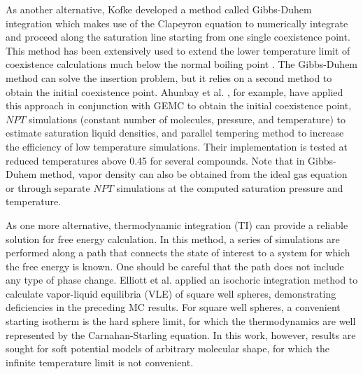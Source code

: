 \documentclass[5p,times]{elsarticle}
\begin{document}
As another alternative, Kofke \cite{Kofke1993b} developed a method called Gibbs-Duhem integration which makes use of the Clapeyron equation to numerically integrate and proceed along the saturation line starting from one single coexistence point. This method has been extensively used to extend the lower temperature limit of coexistence calculations much below the normal boiling point \cite{Ahunbay2004} \cite{Vega2009} \citep{Ungerer2000} \cite{Vega2006} \cite{Yiannourakou2018}. The Gibbs-Duhem method can solve the insertion problem, but it relies on a second method to obtain the initial coexistence point. Ahunbay et al. \cite{Ahunbay2004}, for example, have applied this approach in conjunction with GEMC to obtain the initial coexistence point, $NPT$ simulations (constant number of molecules, pressure, and temperature) to estimate saturation liquid densities, and parallel tempering method \cite{Yan1999} to increase the efficiency of low temperature simulations. Their implementation is tested at reduced temperatures above 0.45 for several compounds. Note that in Gibbs-Duhem method, vapor density can also be obtained from the ideal gas equation or through separate $NPT$ simulations at the computed saturation pressure and temperature.


As one more alternative, thermodynamic integration (TI) can provide a reliable solution for free energy calculation. In this method, a series of simulations are performed along a path that connects the state of interest to a system for which the free energy is known. One should be careful that the path does not include any type of phase change\cite{Vega2009}. Elliott et al. \cite{Elliott1999a} applied an isochoric integration method to calculate vapor-liquid equilibria (VLE) of square well spheres, demonstrating deficiencies in the preceding MC results.  For square well spheres, a convenient starting isotherm is the hard sphere limit, for which the thermodynamics are well represented by the Carnahan-Starling equation\cite{Carnahan1969a}. In this work, however, results are sought for soft potential models of arbitrary molecular shape, for which the infinite temperature limit is not convenient. 
\end{document}

